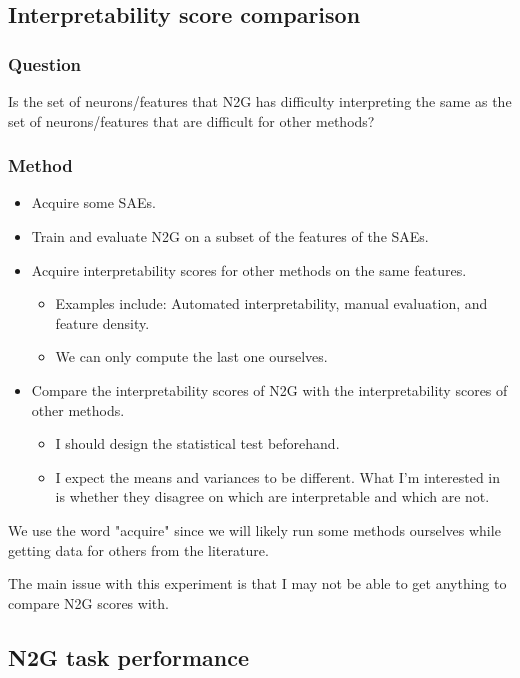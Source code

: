 \documentclass[../../main.tex]{subfiles}
\begin{document}
\subsection{Interpretability score comparison}
\subsubsection{Question}
Is the set of neurons/features that N2G has difficulty interpreting the same as the set of neurons/features that are difficult for other methods?

\subsubsection{Method}
\begin{itemize}
    \item Acquire some SAEs.
    \item Train and evaluate N2G on a subset of the features of the SAEs.
    \item Acquire interpretability scores for other methods on the same features.
    \begin{itemize}
        \item Examples include: Automated interpretability, manual evaluation, and feature density.
        \item We can only compute the last one ourselves.
    \end{itemize}
    \item Compare the interpretability scores of N2G with the interpretability scores of other methods.
    \begin{itemize}
        \item I should design the statistical test beforehand.
        \item I expect the means and variances to be different.
        What I'm interested in is whether they disagree on which are interpretable and which are not.
    \end{itemize}
\end{itemize}
We use the word "acquire" since we will likely run some methods ourselves while getting data for others from the literature.

The main issue with this experiment is that I may not be able to get anything to compare N2G scores with.

\subsection{N2G task performance}
\end{document}
